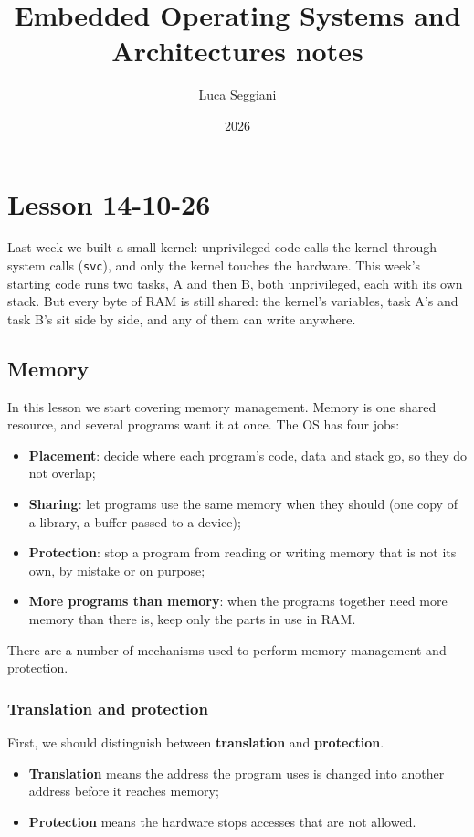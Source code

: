 \documentclass[a4paper,11pt]{article}
\title{Embedded Operating Systems and Architectures notes}
\author{Luca Seggiani}
\date{2026}
\begin{document}
\section{Lesson 14-10-26}

\thispagestyle{empty}
\pagestyle{fancy}


Last week we built a small kernel: unprivileged code calls the kernel through system
calls (\texttt{svc}), and only the kernel touches the hardware.
This week's starting code runs two tasks, A and then B, both unprivileged, each with its
own stack. But every byte of RAM is still shared: the kernel's variables, task A's and task
B's sit side by side, and any of them can write anywhere.

\subsection{Memory}

In this lesson we start covering memory management.
Memory is one shared resource, and several programs want it at once. The OS has four jobs:
\begin{itemize}
	\item
	      \textbf{Placement}: decide where each program's code, data and stack
	      go, so they do not overlap;
	\item
	      \textbf{Sharing}: let programs use the same memory when they should
	      (one copy of a library, a buffer passed to a device);
	\item
	      \textbf{Protection}: stop a program from reading or writing memory
	      that is not its own, by mistake or on purpose;
	\item
	      \textbf{More programs than memory}: when the programs together need
	      more memory than there is, keep only the parts in use in RAM.
\end{itemize}

There are a number of mechanisms used to perform memory management and protection.

\subsubsection{Translation and protection}

First, we should distinguish between \textbf{translation} and \textbf{protection}.

\begin{itemize}
	\item
	      \textbf{Translation} means the address the program uses is changed into another address before it reaches memory;
	\item
	      \textbf{Protection} means the hardware stops accesses that are not allowed.
\end{itemize}
\end{document}
